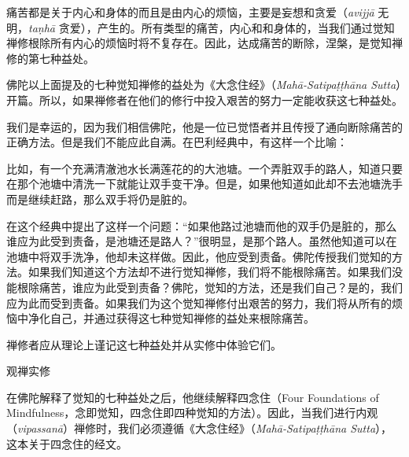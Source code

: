 痛苦都是关于内心和身体的而且是由内心的烦恼，主要是妄想和贪爱（{\it avijj\=a} 无明，{\it ta\d nh\=a} 贪爱），产生的。所有类型的痛苦，\1内心和和身体的，当我们通过觉知禅修根除所有内心的烦恼时将不复存在。因此，达成痛苦的断除，涅槃，是觉知禅修的第七种益处。

佛陀以上面提及的七种觉知禅修的益处为《大念住经》（{\it Mah\=a-Satipa\d t\d th\=ana Sutta}）开篇。所以，如果禅修者在他们的修行中投入艰苦的努力一定能收获这七种益处。

我们是幸运的，因为我们相信佛陀，他是一位已觉悟者并且传授了通向断除痛苦的正确方法。但是我们不能应此自满。在巴利经典中，有这样一个比喻：

比如，有一个充满清澈池水长满莲花的的大池塘。一个弄脏双手的路人，知道只要在那个池塘中清洗一下就能让双手变干净。但是，如果他知道如此却不去池塘洗手而是继续赶路，那么双手将仍是脏的。

在这个经典中提出了这样一个问题：“如果他路过池塘而他的双手仍是脏的，那么谁应为此受到责备，是池塘还是路人？”很明显，是那个路人。虽然他知道可以在池塘中将双手洗净，他却未这样做。因此，他应受到责备。佛陀传授我们觉知的方法。如果我们知道这个方法却不进行觉知禅修，我们将不能根除痛苦。如果我们没能根除痛苦，谁应为此受到责备？佛陀，觉知的方法，还是我们自己？是的，我们应为此而受到责备。如果我们为这个觉知禅修付出艰苦的努力，我们将从所有的烦恼中净化自己，并通过获得这七种\1觉知禅修的益处来根除痛苦。

禅修者应从理论上谨记这七种益处并从实修中体验它们。

\subsectnon 观禅实修

在佛陀解释了觉知的七种益处之后，他继续解释四念住（Four Foundations of Mindfulness，念即觉知，四念住即四种觉知的方法）。因此，当我们进行内观（{\it vipassan\=a}）禅修时，我们必须遵循《大念住经》（{\it Mah\=a-Satipa\d t\d th\=ana Sutta}），这本关于四念住的经文。

\endchapter

\byebye
